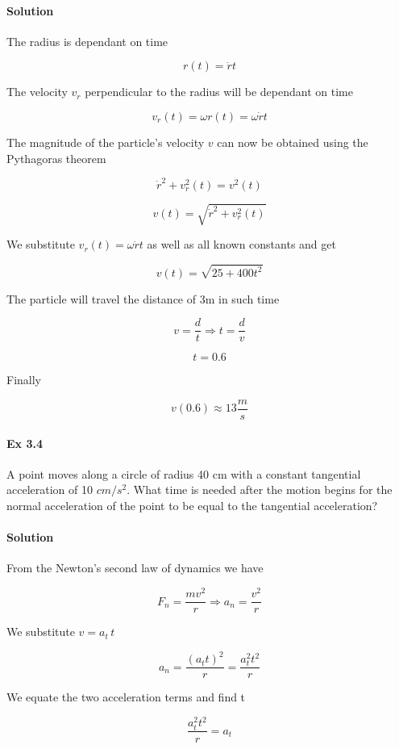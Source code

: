 \documentclass{article}
\begin{document}
\paragraph{Solution}

The radius is dependant on time

\[ r(t) = \dot{r} t \]

The velocity $v_r$ perpendicular to the radius will be dependant on time

\[ v_r(t) = \omega r(t) = \omega \dot{r} t \]

The magnitude of the particle's velocity $v$ can now be obtained using the Pythagoras theorem

\[ \dot{r}^2 + v_r^2(t) = v^2(t) \]

\[ v(t) = \sqrt{\dot{r}^2 + v_r^2(t)} \]

We substitute $v_r(t) = \omega \dot{r} t$ as well as all known constants and get

\[ v(t) = \sqrt{25 + 400 t^2} \]

The particle will travel the distance of 3m in such time

\[ v = \frac{d}{t} \Rightarrow t = \frac{d}{v} \]

\[ t = 0.6 \]

Finally

\[ v(0.6) \approx 13 \frac{m}{s} \]


\paragraph{Ex 3.4}
A point moves along a circle of radius 40 cm  with a constant tangential acceleration of 10 $cm/s^2$. What time is needed after the motion begins for the normal acceleration of the point to be equal to the tangential acceleration?
\paragraph{Solution}

From the Newton's second law of dynamics we have

\[ F_n = \frac{mv^2}{r} \Rightarrow a_n = \frac{v^2}{r} \]

We substitute $v = a_t \, t$

\[  a_n = \frac{(a_tt)^2}{r} = \frac{a_t^2t^2}{r} \]

We equate the two acceleration terms and find t

\[ \frac{a_t^2t^2}{r} = a_t \]
\end{document}
